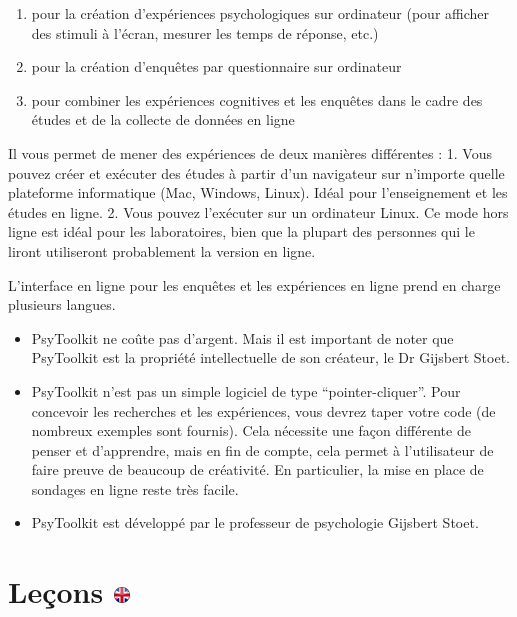 \documentclass[
]{book}
\providecommand{\tightlist}{%
  \setlength{\itemsep}{0pt}\setlength{\parskip}{0pt}}
\begin{document}
\begin{enumerate}
\def\labelenumi{\arabic{enumi}.}
\tightlist
\item
  pour la création d'expériences psychologiques sur ordinateur (pour afficher des stimuli à l'écran, mesurer les temps de réponse, etc.)
\item
  pour la création d'enquêtes par questionnaire sur ordinateur
\item
  pour combiner les expériences cognitives et les enquêtes dans le cadre des études et de la collecte de données en ligne
\end{enumerate}

Il vous permet de mener des expériences de deux manières différentes :
1. Vous pouvez créer et exécuter des études à partir d'un navigateur sur n'importe quelle plateforme informatique (Mac, Windows, Linux). Idéal pour l'enseignement et les études en ligne.
2. Vous pouvez l'exécuter sur un ordinateur Linux. Ce mode hors ligne est idéal pour les laboratoires, bien que la plupart des personnes qui le liront utiliseront probablement la version en ligne.

L'interface en ligne pour les enquêtes et les expériences en ligne prend en charge plusieurs langues.

\begin{itemize}
\tightlist
\item
  PsyToolkit ne coûte pas d'argent. Mais il est important de noter que PsyToolkit est la propriété intellectuelle de son créateur, le Dr Gijsbert Stoet.
\item
  PsyToolkit n'est pas un simple logiciel de type ``pointer-cliquer''. Pour concevoir les recherches et les expériences, vous devrez taper votre code (de nombreux exemples sont fournis). Cela nécessite une façon différente de penser et d'apprendre, mais en fin de compte, cela permet à l'utilisateur de faire preuve de beaucoup de créativité. En particulier, la mise en place de sondages en ligne reste très facile.
\item
  PsyToolkit est développé par le professeur de psychologie Gijsbert Stoet.
\end{itemize}

\hypertarget{leuxe7ons}{%
\section[Leçons ]{\texorpdfstring{Leçons \href{https://www.psytoolkit.org/\#_lessons}{\protect\includegraphics{img/ukflag.png}}}{Leçons }}\label{leuxe7ons}}
\end{document}
